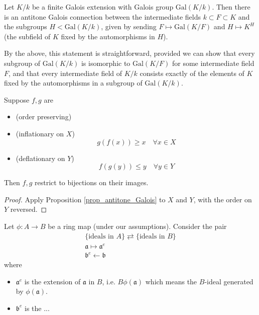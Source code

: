 \documentclass[12pt]{article}
\begin{document}
\begin{example}
	Let $K/k$ be a finite Galois extension with Galois group $\text{Gal}(K/k)$. Then there is an antitone Galois connection between the intermediate fields $k\subset F\subset K$ and the subgroups $H<\text{Gal}(K/k)$, given by sending $F\mapsto \text{Gal}(K/F)$ and $H\mapsto K^H$ (the subfield of $K$ fixed by the automorphisms in $H$).

	By the above, this statement is straightforward, provided we can show that every subgroup of $\text{Gal}(K/k)$ is isomorphic to $\text{Gal}(K/F)$ for some intermediate field $F$, and that every intermediate field of $K/k$ consists exactly of the elements of $K$ fixed by the automorphisms in a subgroup of $\text{Gal}(K/k)$.
\end{example}

\begin{corollary}
	Suppose $f,g$ are 
	\begin{itemize}
		\item (order preserving)
		\item (inflationary on $X$) 
			\begin{equation*}
				g(f(x)) \geq x \quad \forall x\in X
			\end{equation*}
		\item (deflationary on $Y$)
			\begin{equation*}
				f(g(y)) \leq y \quad \forall y\in Y
			\end{equation*}
	\end{itemize}
	Then $f,g$ restrict to bijections on their images.
\end{corollary}
\begin{proof}
	Apply Proposition \ref{prop_antitone_Galois} to $X$ and $Y$, with the order on $Y$ reversed.
\end{proof}

\begin{example}
	Let $\phi:A\to B$ be a ring map (under our assumptions). Consider the pair 
	\begin{gather*}
		\{\text{ideals in } A\} \rightleftarrows \{\text{ideals in }B \} \\
		\mathfrak{a} \mapsto \mathfrak{a}^e \\
		\mathfrak{b}^e \leftarrow \mathfrak{b}
	\end{gather*}
	where
	\begin{itemize}
		\item $\mathfrak{a}^e$ is the extension of $\mathfrak{a}$ in $B$, i.e. $B\phi(\mathfrak{a})$ which means the $B$-ideal generated by $\phi(\mathfrak{a})$. 
		\item $\mathfrak{b}^e$ is the ... 
	\end{itemize}
\end{example}
\end{document}

